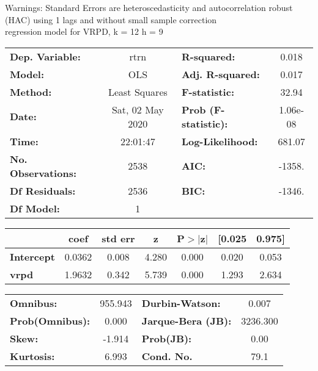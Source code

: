Warnings: \newline
 [1] Standard Errors are heteroscedasticity and autocorrelation robust (HAC) using 1 lags and without small sample correction\\ 

regression model for VRPD, k = 12 h = 9\begin{center}
\begin{tabular}{lclc}
\toprule
\textbf{Dep. Variable:}    &       rtrn       & \textbf{  R-squared:         } &     0.018   \\
\textbf{Model:}            &       OLS        & \textbf{  Adj. R-squared:    } &     0.017   \\
\textbf{Method:}           &  Least Squares   & \textbf{  F-statistic:       } &     32.94   \\
\textbf{Date:}             & Sat, 02 May 2020 & \textbf{  Prob (F-statistic):} &  1.06e-08   \\
\textbf{Time:}             &     22:01:47     & \textbf{  Log-Likelihood:    } &    681.07   \\
\textbf{No. Observations:} &        2538      & \textbf{  AIC:               } &    -1358.   \\
\textbf{Df Residuals:}     &        2536      & \textbf{  BIC:               } &    -1346.   \\
\textbf{Df Model:}         &           1      & \textbf{                     } &             \\
\bottomrule
\end{tabular}
\begin{tabular}{lcccccc}
                   & \textbf{coef} & \textbf{std err} & \textbf{z} & \textbf{P$> |$z$|$} & \textbf{[0.025} & \textbf{0.975]}  \\
\midrule
\textbf{Intercept} &       0.0362  &        0.008     &     4.280  &         0.000        &        0.020    &        0.053     \\
\textbf{vrpd}      &       1.9632  &        0.342     &     5.739  &         0.000        &        1.293    &        2.634     \\
\bottomrule
\end{tabular}
\begin{tabular}{lclc}
\textbf{Omnibus:}       & 955.943 & \textbf{  Durbin-Watson:     } &    0.007  \\
\textbf{Prob(Omnibus):} &   0.000 & \textbf{  Jarque-Bera (JB):  } & 3236.300  \\
\textbf{Skew:}          &  -1.914 & \textbf{  Prob(JB):          } &     0.00  \\
\textbf{Kurtosis:}      &   6.993 & \textbf{  Cond. No.          } &     79.1  \\
\bottomrule
\end{tabular}
\end{center}

